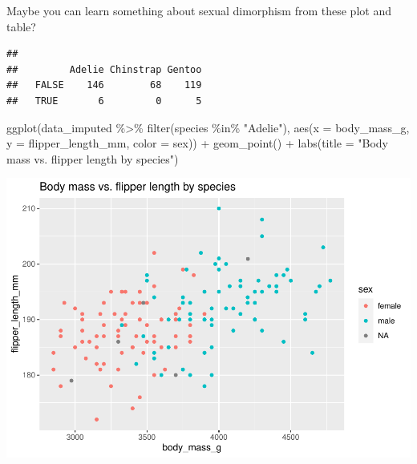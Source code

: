 \documentclass[
]{book}
\newenvironment{Shaded}{\begin{snugshade}}{\end{snugshade}}
\newcommand{\AttributeTok}[1]{\textcolor[rgb]{0.77,0.63,0.00}{#1}}
\newcommand{\FunctionTok}[1]{\textcolor[rgb]{0.00,0.00,0.00}{#1}}
\newcommand{\NormalTok}[1]{#1}
\newcommand{\SpecialCharTok}[1]{\textcolor[rgb]{0.00,0.00,0.00}{#1}}
\newcommand{\StringTok}[1]{\textcolor[rgb]{0.31,0.60,0.02}{#1}}
\begin{document}
Maybe you can learn something about sexual dimorphism from these plot
and table?

\begin{Shaded}
\end{Shaded}

\begin{verbatim}
##        
##         Adelie Chinstrap Gentoo
##   FALSE    146        68    119
##   TRUE       6         0      5
\end{verbatim}

\begin{Shaded}
\begin{Highlighting}[]
  \FunctionTok{ggplot}\NormalTok{(data\_imputed }\SpecialCharTok{\%\textgreater{}\%} \FunctionTok{filter}\NormalTok{(species }\SpecialCharTok{\%in\%} \StringTok{"Adelie"}\NormalTok{), }\FunctionTok{aes}\NormalTok{(}\AttributeTok{x =}\NormalTok{ body\_mass\_g, }\AttributeTok{y =}\NormalTok{ flipper\_length\_mm, }\AttributeTok{color =}\NormalTok{ sex)) }\SpecialCharTok{+}
  \FunctionTok{geom\_point}\NormalTok{() }\SpecialCharTok{+}
  \FunctionTok{labs}\NormalTok{(}\AttributeTok{title =} \StringTok{"Body mass vs. flipper length by species"}\NormalTok{)}
\end{Highlighting}
\end{Shaded}

\includegraphics{data_files/figure-latex/unnamed-chunk-14-1.pdf}
\end{document}
